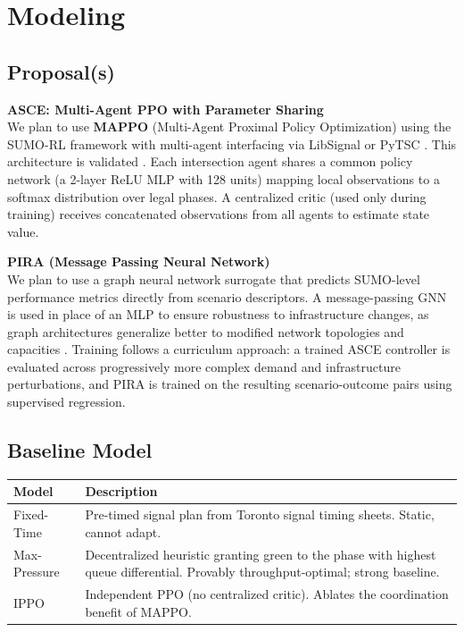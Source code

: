 \documentclass[10pt,twocolumn]{article}
\begin{document}
\section{Modeling}
\subsection{Proposal(s)}
\textbf{ASCE: Multi-Agent PPO with Parameter Sharing}\\
We plan to use \textbf{MAPPO} (Multi-Agent Proximal Policy Optimization) using the SUMO-RL framework with multi-agent interfacing via LibSignal or PyTSC \cite{libsignal,pytSC}. This architecture is validated \cite{citylight}. Each intersection agent shares a common policy network (a 2-layer ReLU MLP with 128 units) mapping local observations to a softmax distribution over legal phases. A centralized critic (used only during training) receives concatenated observations from all agents to estimate state value.

\textbf{PIRA (Message Passing Neural Network)}\\
We plan to use a graph neural network surrogate that predicts SUMO-level performance metrics directly from scenario descriptors. A message-passing GNN is used in place of an MLP to ensure robustness to infrastructure changes, as graph architectures generalize better to modified network topologies and capacities \cite{lassen_gnn}. Training follows a curriculum approach: a trained ASCE controller is evaluated across progressively more complex demand and infrastructure perturbations, and PIRA is trained on the resulting scenario-outcome pairs using supervised regression.

\subsection{Baseline Model}
\begin{tabularx}{\columnwidth}{@{}l X@{}}
\toprule
\textbf{Model} & \textbf{Description} \\
\midrule
Fixed-Time & Pre-timed signal plan from Toronto signal timing sheets. Static, cannot adapt. \\
Max-Pressure & Decentralized heuristic granting green to the phase with highest queue differential. Provably throughput-optimal; strong baseline. \\
IPPO & Independent PPO (no centralized critic). Ablates the coordination benefit of MAPPO. \\
\bottomrule
\end{tabularx}
\end{document}
